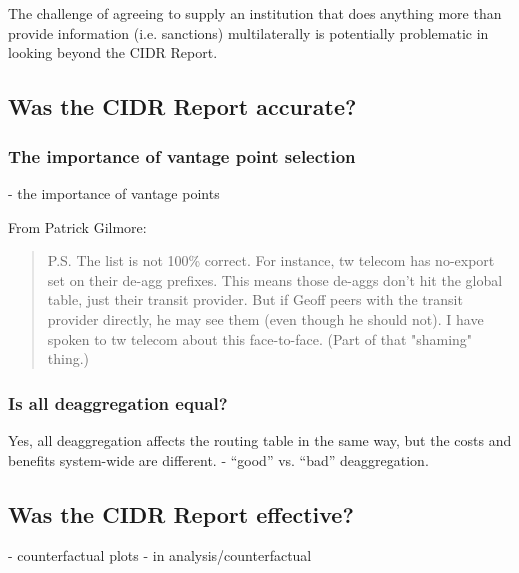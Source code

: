 \chapter{}
\label{chap:discussion}


The challenge of agreeing to supply an institution that does anything more than provide information (i.e. sanctions) multilaterally is potentially problematic in looking beyond the CIDR Report.


\section{Was the CIDR Report accurate?}
\subsection{The importance of vantage point selection}
- the importance of vantage points

From Patrick Gilmore:

\begin{quote}
P.S. The list is not 100\% correct.  For instance, tw telecom has
no-export set on their de-agg prefixes.  This means those de-aggs don't hit the
global table, just their transit provider.  But if Geoff peers with the transit
provider directly, he may see them (even though he should not).  I have spoken
to tw telecom about this face-to-face.  (Part of that "shaming" thing.)
\end{quote}

\subsection{Is all deaggregation equal?}
Yes, all deaggregation affects the routing table in the same way, but the costs
and benefits system-wide are different.
- ``good'' vs. ``bad'' deaggregation.

\section{Was the CIDR Report effective?}
- counterfactual plots
- in analysis/counterfactual

